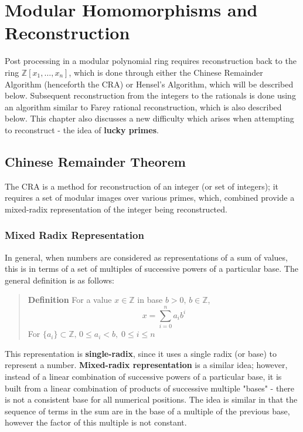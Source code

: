 \documentclass[letterpaper,12pt,titlepage,oneside,final]{book}
\newenvironment{defn}{\begin{quote}%
  \textbf{Definition }%
  \quad
}{%
\end{quote}%
}
\begin{document}
\chapter{Modular Homomorphisms and Reconstruction}

Post processing in a modular polynomial ring requires reconstruction back to the ring ${\mathbb{Z}[x_1, \ldots, x_n]}$, which is done through either the Chinese Remainder Algorithm (henceforth the CRA) or Hensel's Algorithm, which will be described below.  Subsequent reconstruction from the integers to the rationals is done using an algorithm similar to Farey rational reconstruction, which is also described below.  This chapter also discusses a new difficulty which arises when attempting to reconstruct - the idea of \textbf{lucky primes}. 

\section{Chinese Remainder Theorem} 

The CRA is a method for reconstruction of an integer (or set of integers); it requires a set of modular images over various primes, which, combined provide a mixed-radix representation of the integer being reconstructed.  

\subsection{Mixed Radix Representation}

In general, when numbers are considered as representations of a sum of values, this is in terms of a set of multiples of successive powers of a particular base.  The general definition is as follows:

\begin{defn}\label{Basic defn}
  For a value ${x \in \mathbb{Z}}$ in base ${b > 0,\, b \in \mathbb{Z}}$,
  \begin{equation*}   x = \sum\limits_{i = 0}^{n}{a_ib^i}     \end{equation*}
  For ${\{a_i\} \subset \mathbb{Z},\, 0 \leq a_i < b, \; 0 \leq i \leq n}$ 
\end{defn}

This representation is \textbf{single-radix}, since it uses a single radix (or base) to represent a number.  \textbf{Mixed-radix representation} is a similar idea; however, instead of a linear combination of successive powers of a particular base, it is built from a linear combination of products of successive multiple "bases" - there is not a consistent base for all numerical positions.  The idea is similar in that the sequence of terms in the sum are in the base of a multiple of the previous base, however the factor of this multiple is not constant.  
\end{document}
